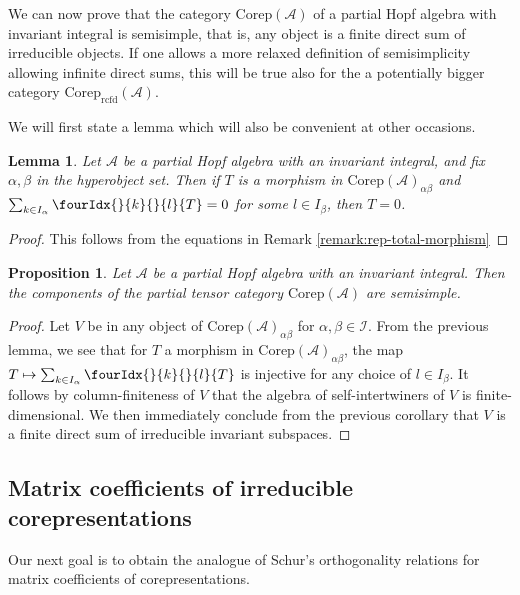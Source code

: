 \documentclass[11pt]{article}
\DeclareMathOperator{\rcf}{\mathrm{rcfd}}
\newcommand{\Corep}{\mathrm{Corep}}
\newcommand{\Gr}[5]{\fourIdx{#2}{#4}{#3}{#5}{#1}}%
\newcommand{\Gru}[3]{\Gr{#1}{}{}{#2}{#3}}
\newtheorem{Lem}[Theorem]{Lemma}
\newtheorem{Prop}[Theorem]{Proposition}
\theoremstyle{definition}
\numberwithin{equation}{section}
\begin{document}
We can now prove that the category $\Corep(\mathscr{A})$ of a partial Hopf algebra with invariant integral is semisimple, that is, any object is a finite direct sum of irreducible objects. If one allows a more relaxed definition of semisimplicity allowing infinite direct sums, this will be true also for the a potentially bigger category $\Corep_{\rcf}(\mathscr{A})$.

We will first state a lemma which will also be convenient at other occasions.

\begin{Lem}\label{LemInjMor}  Let $\mathscr{A}$ be a partial Hopf algebra with an invariant integral, and fix $\alpha,\beta$ in the hyperobject set.  Then if $T$ is a morphism in $\Corep(\mathscr{A})_{\alpha\beta}$ and $\sum_{k\in I_\alpha} \Gru{T}{k}{l}=0$ for some $l \in I_\beta$, then $T=0$.
\end{Lem} 

\begin{proof} This follows from the equations in Remark \ref{remark:rep-total-morphism}
\end{proof}

\begin{Prop}\label{prop:rep-cosemisimple} Let $\mathscr{A}$ be a partial Hopf algebra with an invariant integral.   Then the components of the partial tensor category $\Corep(\mathscr{A})$ are semisimple.
\end{Prop}
\begin{proof} 

Let $V$ be in any object of $\Corep(\mathscr{A})_{\alpha\beta}$ for $\alpha,\beta\in \mathscr{I}$.  From the previous lemma, we see that for $T$ a morphism in $\Corep(\mathscr{A})_{\alpha\beta}$, the map $T\mapsto \sum_{k\in I_\alpha} \Gru{T}{k}{l}$ is injective for any choice of $l\in I_\beta$. It follows by column-finiteness of $V$ that the algebra of self-intertwiners of $V$ is finite-dimensional. We then immediately conclude from the previous corollary that $V$ is a finite direct sum of irreducible invariant subspaces.
\end{proof} 

\subsection{Matrix coefficients of irreducible corepresentations}

Our next goal is to obtain the analogue of Schur's orthogonality
relations for matrix coefficients of corepresentations.
\end{document}
